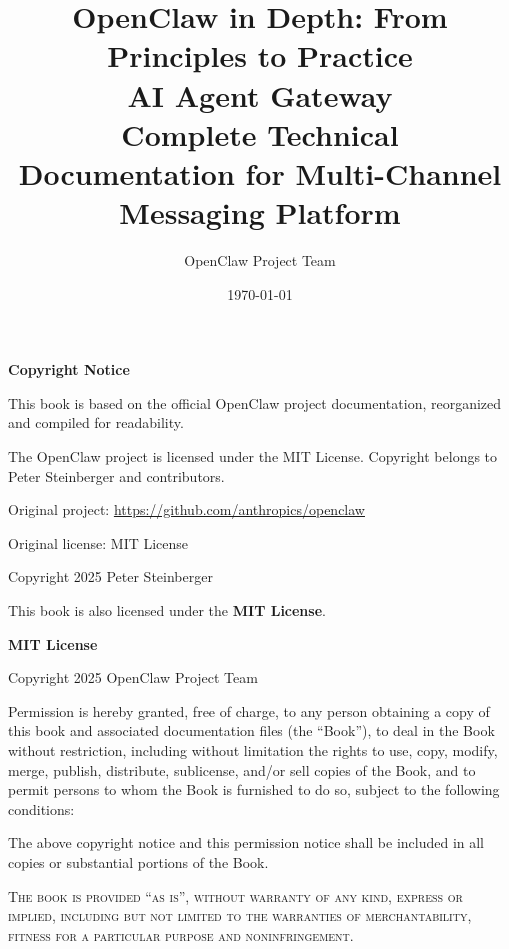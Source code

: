 \documentclass[a4paper,12pt,openany]{book}
\title{
    \vspace{2cm}
    {\Huge\textbf{OpenClaw in Depth: From Principles to Practice}} \\
    \vspace{0.5cm}
    {\Large AI Agent Gateway} \\
    \vspace{0.5cm}
    {\large Complete Technical Documentation for Multi-Channel Messaging Platform}
    \vspace{2cm}
}
\author{OpenClaw Project Team}
\date{\today}
\begin{document}
\maketitle
\thispagestyle{empty}

\clearpage
\thispagestyle{empty}
\vspace*{\fill}
\begin{center}
{\large\textbf{Copyright Notice}}
\end{center}

\bigskip

\noindent This book is based on the official OpenClaw project documentation, reorganized and compiled for readability.

\medskip

\noindent The OpenClaw project is licensed under the MIT License. Copyright belongs to Peter Steinberger and contributors.

\medskip

\noindent Original project: \url{https://github.com/anthropics/openclaw}

\noindent Original license: MIT License

\noindent Copyright \textcopyright{} 2025 Peter Steinberger

\bigskip

\noindent This book is also licensed under the \textbf{MIT License}.

\bigskip

\noindent \textbf{MIT License}

\medskip

\noindent Copyright \textcopyright{} 2025 OpenClaw Project Team

\medskip

\noindent Permission is hereby granted, free of charge, to any person obtaining a copy
of this book and associated documentation files (the ``Book''), to deal
in the Book without restriction, including without limitation the rights
to use, copy, modify, merge, publish, distribute, sublicense, and/or sell
copies of the Book, and to permit persons to whom the Book is furnished to
do so, subject to the following conditions:

\medskip

\noindent The above copyright notice and this permission notice shall be included in all
copies or substantial portions of the Book.

\medskip

\noindent \textsc{The book is provided ``as is'', without warranty of any kind, express or
implied, including but not limited to the warranties of merchantability,
fitness for a particular purpose and noninfringement.}
\end{document}
